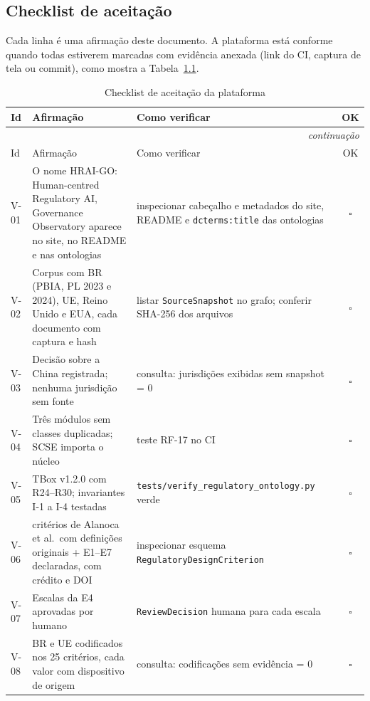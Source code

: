 \documentclass[12pt,a4paper,oneside,english,brazil]{abntex2}
\begin{document}
\begin{apendicesenv}
\partapendices

\chapter{Checklist de aceitação}\label{ap:checklist}
\noindent Cada linha é uma afirmação deste documento. A plataforma está conforme quando todas estiverem marcadas com evidência anexada (link do CI, captura de tela ou commit), como mostra a Tabela~\ref{tab:checklist}.

{\footnotesize
\begin{longtable}{l >{\raggedright\arraybackslash}p{58mm} >{\raggedright\arraybackslash}p{64mm} c}
\caption{Checklist de aceitação da plataforma}\label{tab:checklist}\\
\toprule
Id & Afirmação & Como verificar & OK\\
\midrule\endfirsthead
\multicolumn{4}{r}{\emph{continuação}}\\
\toprule
Id & Afirmação & Como verificar & OK\\
\midrule\endhead
\bottomrule\endlastfoot
V-01 & O nome HRAI-GO: Human-centred Regulatory AI, Governance Observatory aparece no site, no README e nas ontologias & inspecionar cabeçalho e metadados do site, README e \texttt{dcterms:title} das ontologias & $\square$\\
V-02 & Corpus com BR (PBIA, PL 2023 e 2024), UE, Reino Unido e EUA, cada documento com captura e hash & listar \texttt{SourceSnapshot} no grafo; conferir SHA-256 dos arquivos & $\square$\\
V-03 & Decisão sobre a China registrada; nenhuma jurisdição sem fonte & consulta: jurisdições exibidas sem snapshot = 0 & $\square$\\
V-04 & Três módulos sem classes duplicadas; SCSE importa o núcleo & teste RF-17 no CI & $\square$\\
V-05 & TBox v1.2.0 com R24--R30; invariantes I-1 a I-4 testadas & \texttt{tests/verify\_regulatory\_ontology.py} verde & $\square$\\
V-06 & 25 critérios de Alanoca et al.\ com definições originais + E1--E7 declaradas, com crédito e DOI & inspecionar esquema \texttt{RegulatoryDesignCriterion} & $\square$\\
V-07 & Escalas da E4 aprovadas por humano & \texttt{ReviewDecision} humana para cada escala & $\square$\\
V-08 & BR e UE codificados nos 25 critérios, cada valor com dispositivo de origem & consulta: codificações sem evidência = 0 & $\square$\\

\end{longtable}}
\end{apendicesenv}
\end{document}

